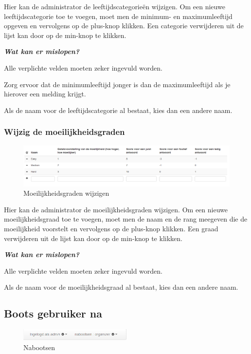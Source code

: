 \documentclass[]{article}
\begin{document}
Hier kan de administrator de leeftijdscategorieën wijzigen. Om een nieuwe leeftijdscategorie toe te voegen, moet men de minimum- en maximumleeftijd opgeven en vervolgens op de plus-knop klikken. Een categorie verwijderen uit de lijst kan door op de min-knop te klikken.

\textbf{\textit{Wat kan er mislopen?}}

Alle verplichte velden moeten zeker ingevuld worden.

Zorg ervoor dat de minimumleeftijd jonger is dan de maximumleeftijd als je hierover een melding krijgt.

Als de naam voor de leeftijdscategorie al bestaat, kies dan een andere naam.

\subsubsection{Wijzig de moeilijkheidsgraden}

\begin{figure}[!ht]
	\centering
	\includegraphics[width=1\textwidth]{img/difficulty}
	\caption{Moeilijkheidsgraden wijzigen}
	\label{difficulty}
\end{figure}

Hier kan de administrator de moeilijkheidsgraden wijzigen. Om een nieuwe moeilijkheidsgraad toe te voegen, moet men de naam en de rang meegeven die de moeilijkheid voorstelt en vervolgens op de plus-knop klikken. Een graad verwijderen uit de lijst kan door op de min-knop te klikken.

\textbf{\textit{Wat kan er mislopen?}}

Alle verplichte velden moeten zeker ingevuld worden.

Als de naam voor de moeilijkheidsgraad al bestaat, kies dan een andere naam.

\subsection{Boots gebruiker na}

\begin{figure}[!ht]
	\centering
	\includegraphics[width=0.5\textwidth]{img/mimic}
	\caption{Nabootsen}
	\label{mimic}
\end{figure}
\end{document}
